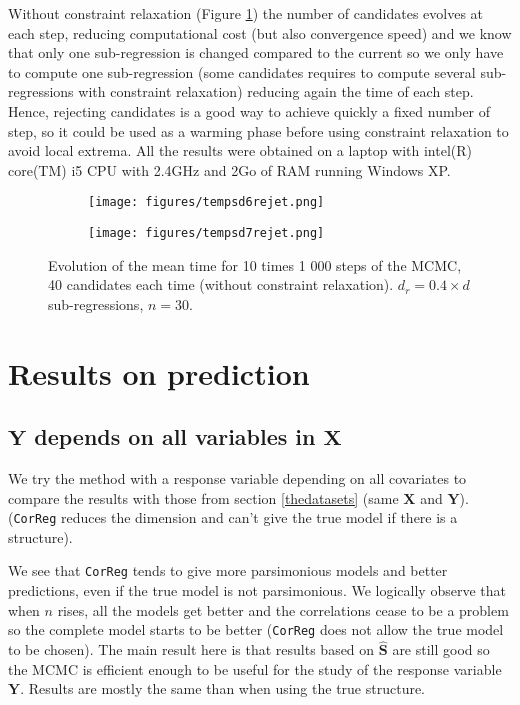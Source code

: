 \documentclass[12pt,a4paper]{report}
\begin{document}
 Without constraint relaxation (Figure \ref{tempsdrejet}) the number of candidates evolves at each step, reducing computational cost (but also convergence speed) and we know that only one sub-regression is changed compared to the current so we only have to compute one sub-regression (some candidates requires to compute several sub-regressions with constraint relaxation) reducing again the time of each step. Hence, rejecting candidates is a good way to achieve quickly a fixed number of step, so it could be used as a warming phase before using constraint relaxation to avoid local extrema. All the results were obtained on a laptop with intel(R) core(TM) i5 CPU with 2.4GHz and 2Go of RAM running Windows XP.
\begin{figure}[h]
\centering
	\begin{subfigure}
	\centering
		\texttt{[image: figures/tempsd6rejet.png]} 
	\end{subfigure}
	\begin{subfigure}
	\centering
		\texttt{[image: figures/tempsd7rejet.png]} 
	\end{subfigure}
	\caption{Evolution of the mean time for 10 times 1 000 steps of the MCMC, 40 candidates each time (without constraint relaxation). $d_r=0.4\times d$ sub-regressions, $n=30$.}\label{tempsdrejet}
\end{figure} 
  
\clearpage
\section{Results on prediction}\label{compY}
\subsection{$\boldsymbol{Y}$ depends on all variables in $\boldsymbol{X}$}	 \label{explsimtout}	
We try the method with a response variable depending on all covariates to compare the results with those from section \ref{thedatasets} (same $\boldsymbol{X}$ and $\boldsymbol{Y}$). ({\tt CorReg} reduces the dimension and can't give the true model if there is a structure). %

 We see that {\tt CorReg} tends to give more parsimonious models and better predictions, even if the true model is not parsimonious. We logically observe that when $n$ rises, all the models get better and the correlations cease to be a problem so the complete model starts to be better ({\tt CorReg} does not allow the true model to be chosen). The main result here is that results based on $\hat{\boldsymbol{S}}$ are still good so the MCMC is efficient enough to be useful for the study of the response variable $\boldsymbol{Y}$. Results are mostly the same than when using the true structure.\\
 
\end{document}
